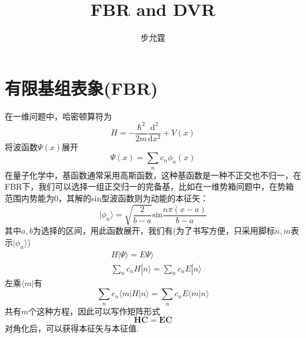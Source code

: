 \documentclass[]{article}
\title{FBR and DVR}
\author{步允霆}
\begin{document}
	\maketitle
	
\section{有限基组表象(FBR)}
在一维问题中，哈密顿算符为
\begin{equation}
	H=-\dfrac{\hbar^2}{2m}\dfrac{\mathrm{d}^2}{\mathrm{d}x^2}+V(x)
\end{equation}
将波函数$\Psi(x)$展开
\begin{equation}
	\Psi(x)=\sum\limits_nc_n\phi_n(x)
\end{equation}
在量子化学中，基函数通常采用高斯函数，这种基函数是一种不正交也不归一，在FBR下，我们可以选择一组正交归一的完备基，比如在一维势箱问题中，在势箱范围内势能为0，其解的sin型波函数则为动能的本征矢：
\begin{equation}
	|\phi_n\rangle=\sqrt{\dfrac{2}{b-a}}\mathrm{sin}\dfrac{n\pi(x-a)}{b-a}
\end{equation}
其中$a, b$为选择的区间，用此函数展开，我们有(为了书写方便，只采用脚标$n, m$表示$|\phi_n\rangle$)
\begin{align}
	&H|\Psi\rangle=E\Psi \rangle\nonumber\\
	&\sum\limits_nc_nH|n\rangle=\sum\limits_nc_nE|n\rangle
\end{align}
左乘$\langle m|$有
\begin{equation}
	\sum\limits_nc_n\langle m|H|n\rangle=\sum\limits_nc_nE\langle m|n\rangle
\end{equation}
共有$m$个这种方程，因此可以写作矩阵形式
\begin{equation}
	\mathbf{HC}=\mathbf{EC}
\end{equation}
对角化后，可以获得本征矢与本征值.
\end{document}
